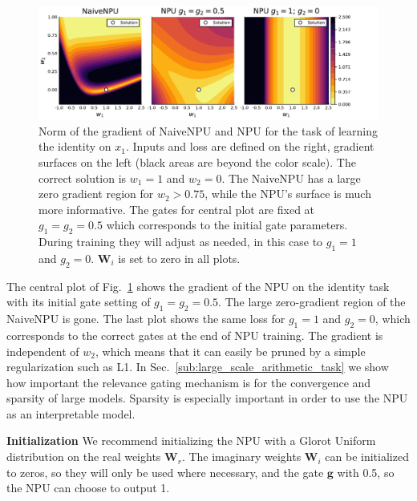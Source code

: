 \documentclass[9pt]{article}
\newcommand{\Wre}{\bm W_{r}}
\newcommand{\Wim}{\bm W_{i}}
\begin{document}
\begin{figure}
  \centering
  \begin{minipage}{0.55\textwidth}
    \includegraphics[width=\textwidth]{npu_gatednpu_id_grad.pdf}
  \end{minipage}
  \begin{minipage}{0.42\textwidth}
  \end{minipage}
  \caption{Norm of the gradient of NaiveNPU and NPU for the task
  of learning the identity on $x_1$. Inputs and
  loss are defined on the right, gradient surfaces on the left
  (black areas are beyond the color scale). The correct solution is
  $w_1=1$ and $w_2=0$.  The NaiveNPU has a large zero gradient region for
  $w_2>0.75$, while the NPU's surface is much more informative. The gates
  for central plot are fixed at $g_1=g_2=0.5$ which corresponds to the initial
  gate parameters. During training they will adjust as needed, in this case to
  $g_1=1$ and $g_2=0$. $\bm W_i$ is set to zero in all plots.
  }%
  \label{fig:id_loss}
\end{figure}
The central plot of Fig.~\ref{fig:id_loss} shows the gradient of the NPU
on the identity task with its initial gate setting of $g_1=g_2=0.5$. The
large zero-gradient region of the NaiveNPU is gone. The last plot shows the
same loss for $g_1=1$ and $g_2=0$, which corresponds to the correct gates at
the end of NPU training. The gradient is independent of $w_2$, which
means that it can easily be pruned by a simple regularization such as L1.  In
Sec.~\ref{sub:large_scale_arithmetic_task} we show how important the relevance
gating mechanism is for the convergence and sparsity of large models.  Sparsity
is especially important in order to use the NPU as an interpretable model.

\textbf{Initialization}%
\label{sub:initialization}
We recommend initializing the NPU with a Glorot Uniform distribution on the
real weights $\Wre$. The imaginary weights $\Wim$ can be initialized to zeros,
so they will only be used where necessary, and the gate $\bm g$ with 0.5, so
the NPU can choose to output 1.
\end{document}
